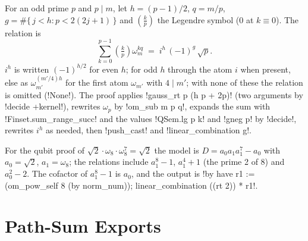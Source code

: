 {{{\begin{algorithm}\label{alg:lean-export-gauss}
For an odd prime $p$ and $p \mid m$, let $h=(p-1)/2$, $q=m/p$,
$g=\#\{\,j<h : p < 2(2j+1)\,\}$ and $\left(\frac{k}{p}\right)$ the Legendre symbol (0 at
$k\equiv 0$). The relation is
\[
  \sum_{k=0}^{p-1} \left(\tfrac{k}{p}\right)\omega_m^{kq} \;=\; i^{h}\,(-1)^{g}\,\sqrt{p}.
\]
$i^{h}$ is written $(-1)^{h/2}$ for even $h$; for odd $h$ through the atom $i$ when present,
else as $\omega_{m'}^{(m'/4)h}$ for the first atom $\omega_{m'}$ with $4 \mid m'$; with none of
these the relation is omitted (\lexpy!None!). The proof applies
\lexlean!gauss_rt p (h p + 2p)! (two arguments by \lexlean!decide +kernel!), rewrites $\omega_p$ by
\lexlean!om_sub m p q!, expands the sum with \lexlean!Finset.sum_range_succ! and the values
\lexlean!QSem.lg p k! and \lexlean!gneg p! by \lexlean!decide!, rewrites $i^{h}$ as needed, then
\lexlean!push_cast! and \lexlean!linear_combination g!.
\end{algorithm}

\begin{example}
For the qubit proof of $\sqrt2\cdot\omega_8 \cdot \omega_8^{7} = \sqrt2$ the model is
$D = a_0a_1a_1^{7}-a_0$ with $a_0=\sqrt2$, $a_1=\omega_8$; the relations include
$a_1^{8}-1$, $a_1^4+1$ (the prime 2 of 8) and $a_0^2-2$. The cofactor of $a_1^8-1$ is $a_0$,
and the output is
\lexcode!by have r1 := (om_pow_self 8 (by norm_num)); linear_combination ((rt 2)) * r1!.
\end{example}

\section{Path-Sum Exports}\label{sec:lean-export-pathsum}

}}}
